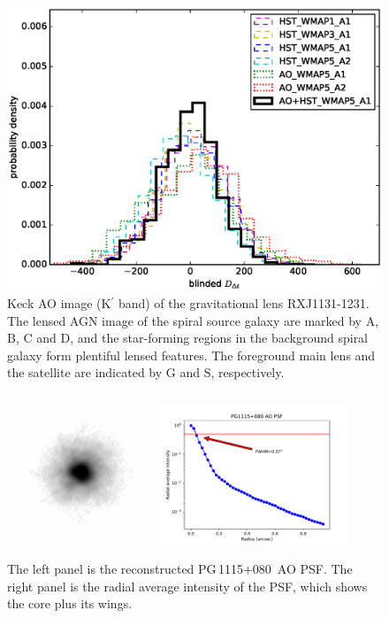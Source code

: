 \documentclass[useAMS,usenatbib]{mnras}
\newcommand\pg{PG\,1115$+$080}
\begin{document}
\begin{figure}
\includegraphics[scale=0.43]{PG1115_systematics_tests.eps}
\caption{Keck AO image (K$^\prime$ band) of the gravitational lens RXJ1131-1231. The lensed AGN image of the spiral source galaxy are marked by A, B, C and D, and the star-forming regions in the background spiral galaxy form plentiful lensed features. The foreground main lens and the satellite are indicated by G and S, respectively.}
\label{fig:PG1115_Ddt}
\end{figure}


\begin{figure}
  \centering
  \includegraphics[width=0.4\textwidth, clip]{PG1115_AO_PSF.png}
  \includegraphics[width=0.5\textwidth, clip]{PG1115_AO_PSF_radius.pdf}
  \caption{The left panel is the reconstructed \pg~AO PSF. The right panel is the radial average intensity of the PSF, which shows the core plus its wings.}
\label{fig:PG1115_AO_PSF}
\end{figure}
\end{document}
